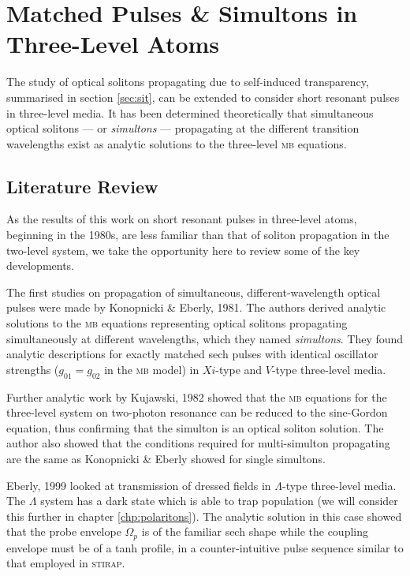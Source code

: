 \section[Matched Pulses \& Simultons]
    {Matched Pulses \& Simultons in Three-Level Atoms}
  \label{sec:nonlinear_simultons}

      The study of optical solitons propagating due to self-induced
      transparency, summarised in section \ref{sec:sit}, can be extended to
      consider short resonant pulses in three-level media. It has been
      determined theoretically that simultaneous optical solitons --- or
      \textit{simultons} --- propagating at the different transition wavelengths
      exist as analytic solutions to the three-level \textsc{mb} equations.

  \subsection{Literature Review}

    As the results of this work on short resonant pulses in three-level atoms,
    beginning in the 1980s, are less familiar than that of soliton propagation
    in the two-level system, we take the opportunity here to review some of the
    key developments.

    The first studies on propagation of simultaneous, different-wavelength
    optical pulses were made by Konopnicki \& Eberly,
    1981\cite{Konopnicki1981,Konopnicki1981a}. The authors derived analytic
    solutions to the \textsc{mb} equations representing optical solitons
    propagating simultaneously at different wavelengths, which they named
    \textit{simultons}. They found analytic descriptions for exactly matched
    sech pulses with identical oscillator strengths (\ie $g_{01} = g_{02}$ in
    the \textsc{mb} model) in $Xi$-type and $V$-type three-level media.

    Further analytic work by Kujawski, 1982\cite{Kujawski1982} showed that the
    \textsc{mb} equations for the three-level system on two-photon resonance can
    be reduced to the sine-Gordon equation\cite{lamb1980elements}, thus
    confirming that the simulton is an optical soliton solution. The author also
    showed that the conditions required for multi-simulton propagating are the
    same as Konopnicki \& Eberly showed for single simultons.

    Eberly, 1999 looked at transmission of dressed fields in $\Lambda$-type
    three-level media\cite{Eberly1999}. The $\Lambda$ system has a dark state
    which is able to trap population (we will consider this further in chapter
    \ref{chp:polaritons}). The analytic solution in this case showed that the
    probe envelope $\Omega_p$ is of the familiar sech shape while the coupling
    envelope must be of a tanh profile, in a counter-intuitive pulse sequence
    similar to that employed in \textsc{stirap}.

